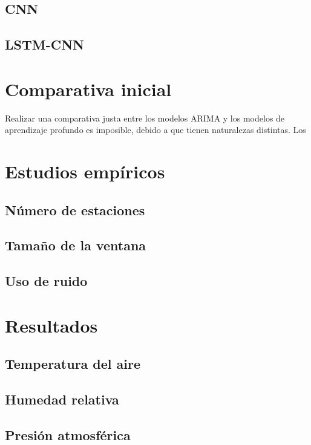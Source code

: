 \subsection{CNN}

\subsection{LSTM-CNN}


\section{Comparativa inicial}
Realizar una comparativa justa entre los modelos ARIMA y los modelos de aprendizaje profundo es imposible, debido a que tienen naturalezas distintas.
Los 

\section{Estudios empíricos}

\subsection{Número de estaciones}

\subsection{Tamaño de la ventana}

\subsection{Uso de ruido}

\section{Resultados}
\subsection{Temperatura del aire}
\subsection{Humedad relativa}
\subsection{Presión atmosférica}

